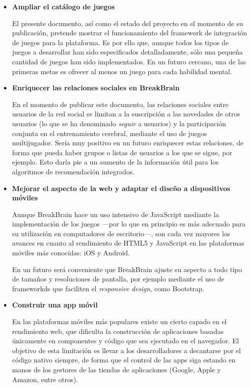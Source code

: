 \begin{itemize}
\item {\bf Ampliar el catálogo de juegos}

El presente documento, así como el estado del proyecto en el momento de su publicación, pretende mostrar el funcionamiento del framework de integración de juegos para la plataforma. Es por ello que, aunque todos los tipos de juegos a desarrollar han sido especificados detalladamente, sólo una pequeña cantidad de juegos han sido implementados. En un futuro cercano, una de las primeras metas es ofrecer al menos un juego para cada habilidad mental.

\item {\bf Enriquecer las relaciones sociales en BreakBrain}

En el momento de publicar este documento, las relaciones sociales entre usuarios de la red social se limitan a la suscripción a las novedades de otros usuarios (lo que se ha denominado {\it seguir} a usuarios) y la participación conjunta en el entrenamiento cerebral, mediante el uso de juegos multijugador. Sería muy positivo en un futuro enriquecer estas relaciones, de forma que pueda haber grupos o listas de usuarios a los que se sigue, por ejemplo. Esto daría pie a un aumento de la información útil para los algoritmos de recomendación integrados.

\item {\bf Mejorar el aspecto de la web y adaptar el diseño a dispositivos móviles}

Aunque BreakBrain hace un uso intensivo de JavaScript mediante la implementación de los juegos ---por lo que en principio es más adecuado para su utilización en computadores de escritorio---, son cada vez mayores los avances en cuanto al rendimiento de HTML5 y JavaScript en las plataformas móviles más conocidas: iOS y Android.

En un futuro será conveniente que BreakBrain ajuste su aspecto a todo tipo de tamaños y resoluciones de pantalla, por ejemplo mediante el uso de frameworkds que faciliten el {\it responsive design}, como Bootstrap.

\item {\bf Construir una app móvil}

En las plataformas móviles más populares existe un cierto capado en el rendimiento web, que dificulta la construcción de aplicaciones basadas únicamente en componentes y código que sea ejecutado en el navegador. El objetivo de esta limitación es llevar a los desarrolladores a decantarse por el código nativo siempre, de forma que el control de las apps siga estando en manos de los gestores de las tiendas de aplicaciones (Google, Apple y Amazon, entre otros).


\end{itemize}
